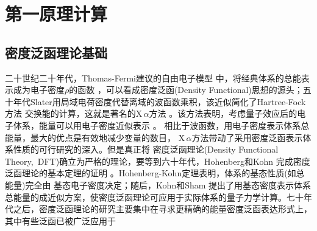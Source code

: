 \setcounter{chapter}{11}
\chapter{第一原理计算}\label{chap:quantum-calculation}
\section{密度泛函理论基础} \label{section:dft}

二十世纪二十年代，Thomas-Fermi{建议的自由电子模型}%
中，将经典体系的总能表示成为电子密度$\rho$的函数%
，可以看成密度泛函(Density Functional)思想的源头；五十年代Slater用局域电荷密度代替离域的波函数乘积，该近似简化了Hartree-Fock方法%
交换能的计算，这就是著名的X\,$\alpha$方法%
。该方法表明，考虑量子效应后的电子体系，能量可以用电子密度近似表示
。%
相比于波函数，用电子密度表示体系总能量，最大的优点是有效地减少变量的数目，%
X\,$\alpha$方法带动了采用密度泛函表示体系性质的可行研究的深入。但是真正将
密度泛函理论\textrm{(Density Functional Theory,~DFT)}确立为严格的理论，要等到六十年代，Hohenberg和Kohn%
完成密度泛函理论的基本定理的证明%
。Hohenberg-Kohn定理表明，体系的基态性质(如总能量)完全由%
基态{电}子密度决定；随后，Kohn和Sham%
{提出了用基态密度表示体系总能量的成近似方案，使密度泛函理论可应用于实际体系的量子力学计算。七十年代之后，密度泛函理论的研究主要集中在寻求更精确的能量密度泛函表达形式上，其中有些泛函已被}广泛应用于%
